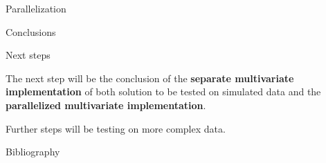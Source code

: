 \documentclass{beamer}
\begin{document}
\begin{section}{Parallelization}
	\begin{frame}[plain]{}
		\sectionpage
	\end{frame}	

	\begin{frame}{}
	\end{frame}

	\begin{frame}{}
	\end{frame}

	\begin{frame}{}
	\end{frame}


	
\end{section}


\begin{section}{Conclusions}
	
    \begin{frame}[plain]{}
		\sectionpage
	\end{frame}

	\begin{frame}{Next steps}
	
		The next step will be the conclusion of the \textbf{separate multivariate implementation} of both solution to be tested on simulated data and the \textbf{parallelized multivariate implementation}.
		
		\vspace{0.5 cm}
		Further steps will be testing on more complex data.
	\end{frame}

	\begin{frame}{Bibliography}
		\nocite{*}
		
		\tiny{  }

	

	\end{frame}
\end{section}
\end{document}
